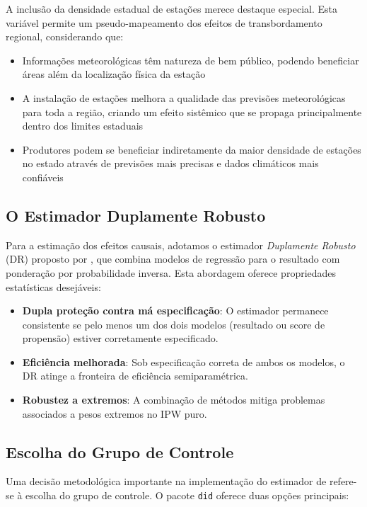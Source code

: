 \documentclass[
	12pt,				%
	oneside,			%
	a4paper,			%
	english,			%
	french,				%
	spanish,			%
	brazil				%
	]{abntex2}
\begin{document}
A inclusão da densidade estadual de estações merece destaque especial. Esta variável permite um pseudo-mapeamento dos efeitos de transbordamento regional, considerando que:

\begin{itemize}
\item Informações meteorológicas têm natureza de bem público, podendo beneficiar áreas além da localização física da estação
\item A instalação de estações melhora a qualidade das previsões meteorológicas para toda a região, criando um efeito sistêmico que se propaga principalmente dentro dos limites estaduais
\item Produtores podem se beneficiar indiretamente da maior densidade de estações no estado através de previsões mais precisas e dados climáticos mais confiáveis
\end{itemize}

\subsection{O Estimador Duplamente Robusto}

Para a estimação dos efeitos causais, adotamos o estimador \textit{Duplamente Robusto} (DR) proposto por , que combina modelos de regressão para o resultado com ponderação por probabilidade inversa. Esta abordagem oferece propriedades estatísticas desejáveis:

\begin{itemize}
\item \textbf{Dupla proteção contra má especificação}: O estimador permanece consistente se pelo menos um dos dois modelos (resultado ou score de propensão) estiver corretamente especificado.

\item \textbf{Eficiência melhorada}: Sob especificação correta de ambos os modelos, o DR atinge a fronteira de eficiência semiparamétrica.

\item \textbf{Robustez a extremos}: A combinação de métodos mitiga problemas associados a pesos extremos no IPW puro.
\end{itemize}

\subsection{Escolha do Grupo de Controle}

Uma decisão metodológica importante na implementação do estimador de  refere-se à escolha do grupo de controle. O pacote \texttt{did} oferece duas opções principais:
\end{document}
